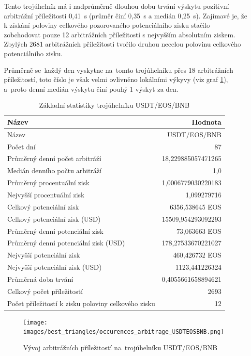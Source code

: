\documentclass[thesis=B,czech]{FITthesis}[2019/03/21]
\begin{document}
Tento trojúhelník má i nadprůměrně dlouhou dobu trvání výskytu pozitivní arbitrážní příležitosti 0,41~s (průměr činí 0,35~s a medián 0,25~s). Zajímavé je, že k získání poloviny celkového pozorovaného potenciálního zisku stačilo zobchodovat pouze 12 arbitrážních příležitostí s nejvyšším absolutním ziskem. Zbylých 2681 arbitrážních příležitostí tvořilo druhou necelou polovinu celkového potenciálního zisku.

Průměrně se~každý den vyskytne na~tomto trojúhelníku přes 18 arbitrážních příležitostí, toto číslo je však velmi ovlivněno lokálními výkyvy (viz graf \ref{occurences_arbitrage_USDTEOSBNB}), a~proto denní medián výskytu činí pouhý 1 výskyt za den.

\begin{table}\centering
\caption{Základní statistiky trojúhelníku USDT/EOS/BNB}
\label{USDTEOSBNB_stats}
\begin{tabular}{|| l | r ||}
\hline Název & Hodnota \\ 
\hline\hline Název & USDT/EOS/BNB \\ 
\hline Počet dní & 87 \\ 
\hline Průměrný denní počet arbitráží & 18,229885057471265 \\ 
\hline Medián denního počtu arbitráží & 1,0 \\ 
\hline Průměrný procentuální zisk & 1,0006779030220183 \\ 
\hline Nejvyšší procentuální zisk & 1,099279716 \\ 
\hline Celkový potenciální zisk & 6356,538645 EOS \\ 
\hline Celkový potenciální zisk (USD) & 15509,954293092293 \\ 
\hline Průměrný denní potenciální zisk & 73,063663 EOS \\ 
\hline Průměrný denní potenciální zisk (USD) & 178,27533670221027 \\ 
\hline Nejvyšší potenciální zisk & 460,426732 EOS \\ 
\hline Nejvyšší potenciální zisk (USD) & 1123,441226324 \\ 
\hline Průměrná doba trvání & 0,4055661658894621 \\ 
\hline Celkový počet příležitostí & 2693 \\ 
\hline Počet příležitostí k zisku poloviny celkového zisku & 12 \\ 
\hline
\end{tabular}
\end{table}

\begin{figure}\centering
	\texttt{[image: images/best\_triangles/occurences\_arbitrage\_USDTEOSBNB.png]}
	\caption{Vývoj arbitrážních příležitostí na~trojúhelníku USDT/EOS/BNB }\label{occurences_arbitrage_USDTEOSBNB}
\end{figure}
\end{document}

